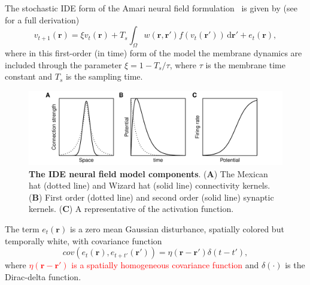\documentclass[review,authoryear,3p]{elsarticle}
\newcommand{\parham}[1]{\textcolor{red}{#1}}
\begin{document}
The stochastic IDE form of the Amari neural field formulation~\cite{Amari1977} is given by (see~\cite{Freestone2011} for a full derivation)
\begin{equation}\label{eq:DiscreteTimeModel}
	v_{t+1}\left(\mathbf{r}\right) = 
	\xi v_t\left(\mathbf{r}\right) + 
	T_s \int_\Omega { 
	    w\left(\mathbf{r},\mathbf{r'}\right)
	    f\left(v_t\left(\mathbf{r}'\right)\right) 
	\, \mathrm{d}\mathbf{r}'} 
	+ e_t\left(\mathbf{r}\right), 
\end{equation}
where in this first-order (in time) form of the model the membrane dynamics are included through the parameter $\xi=1-T_s/\tau$, where $\tau$ is the membrane time constant and $T_s$ is the sampling time. 
\begin{figure}[!t]
\centering
\includegraphics[scale=1]{./Graph/fig2.pdf}
\caption{ {\bf The IDE neural field model components}. (\textbf{A}) The Mexican hat (dotted line) and Wizard hat (solid line) connectivity kernels. (\textbf{B}) First order (dotted line) and second order (solid line) synaptic kernels. (\textbf{C}) A representative of the activation function.}
\label{fig:Modelcomponents}
\end{figure}

The term $e_t(\mathbf r)$ is a zero mean Gaussian disturbance, spatially colored but temporally white, with covariance function 
\begin{equation}
cov\left(e_{t}\left(\mathbf{r}\right),e_{t+t'}\left(\mathbf{r'}\right)\right)=\eta(\mathbf{r}-\mathbf{r'})\delta(t-t'),
\label{eq:FieldDisturbance}
\end{equation}
where \parham{$\eta(\mathbf{r}-\mathbf{r'})$ is a spatially homogeneous covariance function} and $\delta(\cdot)$ is the Dirac-delta function. %
\end{document}
